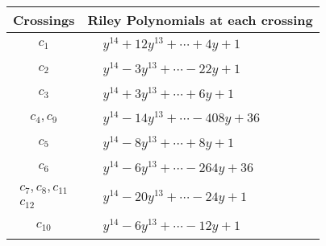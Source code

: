 \documentclass[1p]{elsarticle_modified}
\theoremstyle{definition}
\begin{document}
\begin{tabular}{m{50pt}|m{274pt}}
Crossings & \hspace{64pt}Riley Polynomials at each crossing \\
\hline $$\begin{aligned}c_{1}\end{aligned}$$&$\begin{aligned}
&y^{14}+12 y^{13}+\cdots+4 y+1
\end{aligned}$\\
\hline $$\begin{aligned}c_{2}\end{aligned}$$&$\begin{aligned}
&y^{14}-3 y^{13}+\cdots-22 y+1
\end{aligned}$\\
\hline $$\begin{aligned}c_{3}\end{aligned}$$&$\begin{aligned}
&y^{14}+3 y^{13}+\cdots+6 y+1
\end{aligned}$\\
\hline $$\begin{aligned}c_{4},c_{9}\end{aligned}$$&$\begin{aligned}
&y^{14}-14 y^{13}+\cdots-408 y+36
\end{aligned}$\\
\hline $$\begin{aligned}c_{5}\end{aligned}$$&$\begin{aligned}
&y^{14}-8 y^{13}+\cdots+8 y+1
\end{aligned}$\\
\hline $$\begin{aligned}c_{6}\end{aligned}$$&$\begin{aligned}
&y^{14}-6 y^{13}+\cdots-264 y+36
\end{aligned}$\\
\hline $$\begin{aligned}c_{7},c_{8},c_{11}\\c_{12}\end{aligned}$$&$\begin{aligned}
&y^{14}-20 y^{13}+\cdots-24 y+1
\end{aligned}$\\
\hline $$\begin{aligned}c_{10}\end{aligned}$$&$\begin{aligned}
&y^{14}-6 y^{13}+\cdots-12 y+1
\end{aligned}$\\
\hline
\end{tabular}\\~\\
\end{document}
